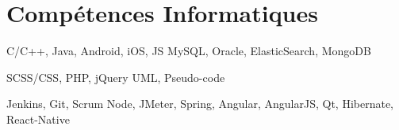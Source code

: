 \section{Compétences Informatiques}
	\begin{minipage}{\textwidth}
		\begin{minipage}{\textwidth}
			{C/C++, Java, Android, iOS, JS}
			{MySQL, Oracle, ElasticSearch, MongoDB}
		\end{minipage}
		
		\smallskip
		\begin{minipage}{\textwidth}
			\smallskip
			{SCSS/CSS, PHP, jQuery}
			{UML, Pseudo-code}
		\end{minipage}
	
		\smallskip
		\begin{minipage}{\textwidth}
			\smallskip
			{Jenkins, Git, Scrum}
			{Node, JMeter, Spring, Angular, AngularJS, Qt, Hibernate, React-Native} %
		\end{minipage}
	\end{minipage}



